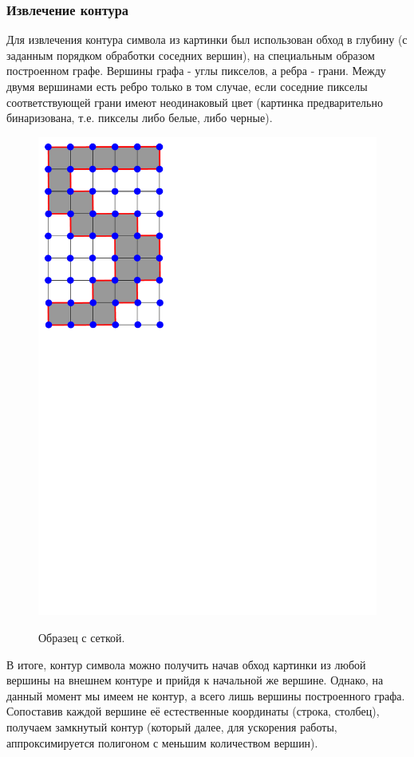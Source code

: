 \subsubsection*{Извлечение контура}
Для извлечения контура символа из картинки был использован обход в глубину (с 
заданным порядком обработки соседних вершин), 
на специальным образом построенном графе. Вершины графа - углы пикселов, а 
ребра - грани. Между двумя вершинами есть ребро только в том случае, если 
соседние пикселы соответствующей грани имеют неодинаковый цвет (картинка предварительно 
бинаризована, т.е. пикселы либо белые, либо черные).
\begin{figure}[H]
\centering
{\includegraphics[scale=0.5, trim = 0mm 170mm 130mm 0mm, clip]{imgs/five}}
\caption{Образец с сеткой.}
\end{figure}
В итоге, контур символа можно получить начав обход картинки из любой вершины на внешнем контуре 
и прийдя к начальной же вершине. Однако, на данный момент мы имеем не контур, а всего лишь вершины построенного графа.
Сопоставив каждой вершине её естественные координаты (строка, столбец), получаем замкнутый контур (который далее,
для ускорения работы, аппроксимируется полигоном с меньшим количеством вершин).

